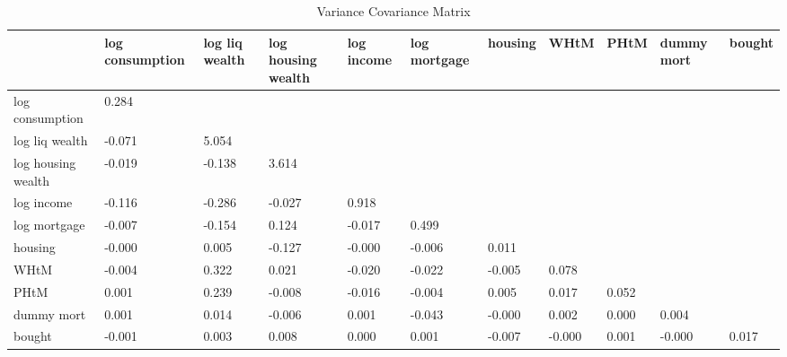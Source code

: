 \begin{table}[htbp]
\caption{\label{clabel} Variance Covariance Matrix}\centering\medskip
\begin{tabular}{lllllllllll} \hline \hline
 & log consumption  & log liq wealth  & log housing wealth  & log income  & log mortgage  & housing  & WHtM  & PHtM  & dummy mort  & bought  \\  \hline 
log consumption &     0.284 \\  
log liq wealth &    -0.071 &     5.054 \\  
log housing wealth &    -0.019 &    -0.138 &     3.614 \\  
log income &    -0.116 &    -0.286 &    -0.027 &     0.918 \\  
log mortgage &    -0.007 &    -0.154 &     0.124 &    -0.017 &     0.499 \\  
housing &    -0.000 &     0.005 &    -0.127 &    -0.000 &    -0.006 &     0.011 \\  
WHtM &    -0.004 &     0.322 &     0.021 &    -0.020 &    -0.022 &    -0.005 &     0.078 \\  
PHtM &     0.001 &     0.239 &    -0.008 &    -0.016 &    -0.004 &     0.005 &     0.017 &     0.052 \\  
dummy mort &     0.001 &     0.014 &    -0.006 &     0.001 &    -0.043 &    -0.000 &     0.002 &     0.000 &     0.004 \\  
bought &    -0.001 &     0.003 &     0.008 &     0.000 &     0.001 &    -0.007 &    -0.000 &     0.001 &    -0.000 &     0.017 \\  
\hline \hline \end{tabular}
\end{table}
